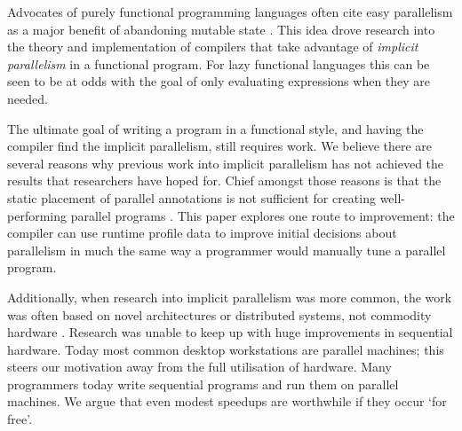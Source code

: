 Advocates of purely functional programming languages often cite easy
parallelism as a major benefit of abandoning mutable state \citep{hughes:thesis,
SPJ:PIFPL}. This idea drove research into the theory and implementation of
compilers that take advantage of \emph{implicit parallelism} in a functional
program. For lazy functional languages this can be seen to be at odds with the
goal of only evaluating expressions when they are needed. 

The ultimate goal of writing a program in a functional style, and having the
compiler find the implicit parallelism, still requires work.  We believe there
are several reasons why previous work into implicit parallelism has not
achieved the results that researchers have hoped for. Chief amongst those
reasons is that the static placement of parallel annotations is not sufficient
for creating well-performing parallel programs \citep{hammond2000research,
hogen1992automatic, tremblay1995impact, feedbackImplicit}. This paper explores
one route to improvement: the compiler can use runtime profile data to improve
initial decisions about parallelism in much the same way a programmer would
manually tune a parallel program.

Additionally, when research into implicit parallelism was more common, the work
was often based on novel architectures or distributed systems, not commodity
hardware \citep{GRIP, hammond2000research}. Research was unable to keep
up with huge improvements in sequential hardware. Today most common desktop
workstations are parallel machines; this steers
our motivation away from the full utilisation of hardware. Many programmers
today write sequential programs and run them on parallel machines. We
argue that even modest speedups are worthwhile if they occur `for free'.

